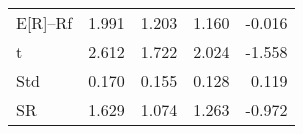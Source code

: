 \begin{tabular}{lrrrr}
\toprule
\midrule
E[R]--Rf & 1.991 & 1.203 & 1.160 & -0.016 \\
t & 2.612 & 1.722 & 2.024 & -1.558 \\
Std & 0.170 & 0.155 & 0.128 & 0.119 \\
SR & 1.629 & 1.074 & 1.263 & -0.972 \\
\bottomrule
\end{tabular}
